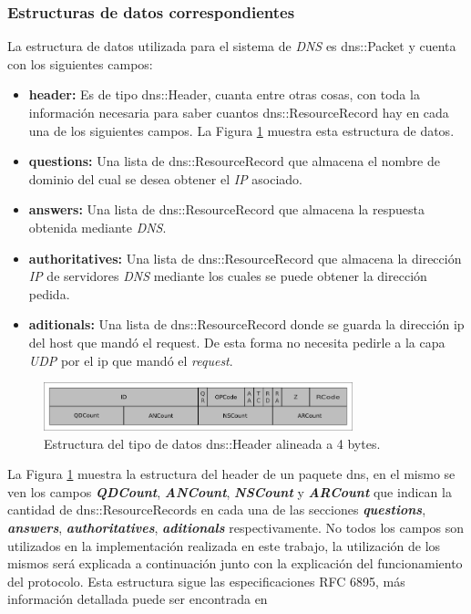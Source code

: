 \documentclass[10pt,a4paper]{article}
\begin{document}
\newpage

\subsubsection{Estructuras de datos correspondientes}
La estructura de datos utilizada para el sistema de \textit{DNS} es dns::Packet y cuenta con los siguientes campos:
\begin{itemize}
\item \textbf{header: } Es de tipo dns::Header, cuanta entre otras cosas, con toda la información necesaria para saber cuantos dns::ResourceRecord hay en cada una de los siguientes campos. La Figura \ref{figure: dns header} muestra esta estructura de datos.
\item \textbf{questions: } Una lista de dns::ResourceRecord que almacena el nombre de dominio del cual se desea obtener el \textit{IP} asociado.
\item \textbf{answers: } Una lista de dns::ResourceRecord que almacena la respuesta obtenida mediante \textit{DNS}.
\item \textbf{authoritatives: } Una lista de dns::ResourceRecord que almacena la dirección \textit{IP} de servidores \textit{DNS} mediante los cuales se puede obtener la dirección pedida.
\item \textbf{aditionals: } Una lista de dns::ResourceRecord donde se guarda la dirección ip del host que mandó el request. De esta forma no necesita pedirle a la capa \textit{UDP} por el ip que mandó el \textit{request}.
\end{itemize}

\begin{figure}[!htb]
    \centering
    \includegraphics[width = 0.8\textwidth]{img/png/dns-header.png}
    \caption{Estructura del tipo de datos dns::Header alineada a 4 bytes.}
    \label{figure: dns header}
\end{figure}

La Figura \ref{figure: dns header} muestra la estructura del header de un paquete dns, en el mismo se ven los campos \textbf{\textit{QDCount}}, \textbf{\textit{ANCount}}, \textbf{\textit{NSCount}} y \textbf{\textit{ARCount}} que indican la cantidad de dns::ResourceRecords en cada una de las secciones \textbf{\textit{questions}}, \textbf{\textit{answers}}, \textbf{\textit{authoritatives}}, \textbf{\textit{aditionals}} respectivamente. No todos los campos son utilizados en la implementación realizada en este trabajo, la utilización de los mismos será explicada a continuación junto con la explicación del funcionamiento del protocolo. Esta estructura sigue las especificaciones RFC 6895, más información detallada puede ser encontrada en \cite{eastlake2013domain}\\
\end{document}
